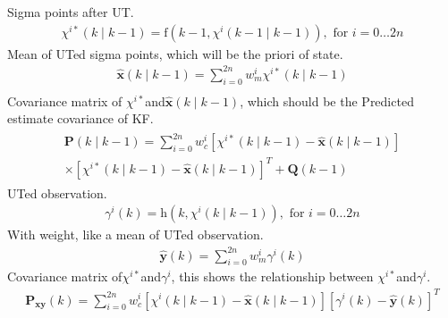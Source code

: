 \documentclass[dvipdfmx]{jsarticle}
\begin{document}
Sigma points after UT.
\begin{equation}\label{Func.}\begin{aligned}
    \chi^{i *}(k \mid k-1)=\mathrm{f}\left(k-1, \chi^{i}(k-1 \mid k-1)\right), \text { for } i=0 \ldots 2 n
\end{aligned}\end{equation}
Mean of UTed sigma points, which will be the priori of state.
\begin{equation}\label{Func.}\begin{aligned}
    \widehat{\mathbf{x}}(k \mid k-1)=\sum_{i=0}^{2 n} w_{m}^{i} \chi^{i *}(k \mid k-1) \\
\end{aligned}\end{equation}
Covariance matrix of $\chi^{i *}$and$\widehat{\mathbf{x}}(k \mid k-1)$, which should be the
Predicted estimate covariance of KF.
\begin{equation}\label{Func.}\begin{aligned}
    \begin{array}{c}
        \mathbf{P}(k \mid k-1)=\sum_{i=0}^{2 n} w_{c}^{i}\left[\chi^{i *}(k \mid k-1)-\widehat{\mathbf{x}}(k \mid k-1)\right] \\
        \times\left[\chi^{i *}(k \mid k-1)-\widehat{\mathbf{x}}(k \mid k-1)\right]^{T}+\mathbf{Q}(k-1)
        \end{array}
\end{aligned}\end{equation}
UTed observation.
\begin{equation}\label{Func.}\begin{aligned}
    \gamma^{i}(k)=\mathrm{h}\left(k, \chi^{i}(k \mid k-1)\right), \text { for } i=0 \ldots 2 n
\end{aligned}\end{equation}
With weight, like a mean of UTed observation.
\begin{equation}\label{Func.}\begin{aligned}
    \widehat{\mathbf{y}}(k)=\sum_{i=0}^{2 n} w_{m}^{i} \gamma^{i}(k)
\end{aligned}\end{equation}
Covariance matrix of$\chi^{i *}$and$\gamma^{i}$, this shows the relationship between $\chi^{i *}$and$\gamma^{i}$.
\begin{equation}\label{Func.}\begin{aligned}
    \mathbf{P}_{\mathbf{x y}}(k)=\sum_{i=0}^{2 n} w_{c}^{i}\left[\chi^{i}(k \mid k-1)-\widehat{\mathbf{x}}(k \mid k-1)\right]\left[\gamma^{i}(k)-\widehat{\mathbf{y}}(k)\right]^{T}
\end{aligned}\end{equation}
\end{document}
